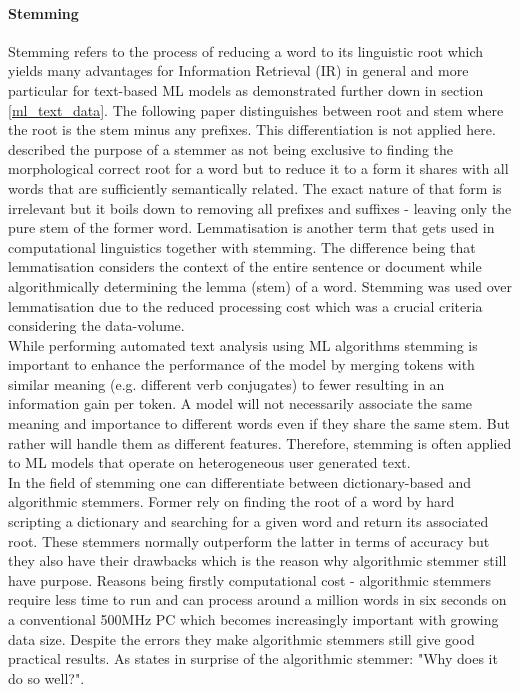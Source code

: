 \paragraph*{Stemming} \label{word_stemming}
Stemming refers to the process of reducing a word to its linguistic root which yields many advantages for Information Retrieval (IR) in general and more particular for text-based ML models as demonstrated further down in section \ref{ml_text_data}. The following paper \textcite{Lovins1968} distinguishes between root and stem where the root is the stem minus any prefixes. This differentiation is not applied here. 
\textcite{Weissweiler2018} described the purpose of a stemmer as not being exclusive to finding the morphological correct root for a word but to reduce it to a form it shares with all words that are sufficiently semantically related. The exact nature of that form is irrelevant but it boils down to removing all prefixes and suffixes - leaving only the pure stem of the former word. Lemmatisation is another term that gets used in computational linguistics together with stemming. The difference being that lemmatisation considers the context of the entire sentence or document while algorithmically determining the lemma (stem) of a word. Stemming was used over lemmatisation due to the reduced processing cost which was a crucial criteria considering the data-volume.\\
While performing automated text analysis using ML algorithms stemming is important to enhance the performance of the model by merging tokens with similar meaning (e.g. different verb conjugates) to fewer resulting in an information gain per token. A model will not necessarily associate the same meaning and importance to different words even if they share the same stem. But rather will handle them as different features. Therefore, stemming is often applied to ML models that operate on heterogeneous user generated text.\\
In the field of stemming one can differentiate between dictionary-based and algorithmic stemmers. Former rely on finding the root of a word by hard scripting a dictionary and searching for a given word and return its associated root. These stemmers normally outperform the latter in terms of accuracy but they also have their drawbacks which is the reason why algorithmic stemmer still have purpose. Reasons being firstly computational cost - algorithmic stemmers require less time to run and can process around a million words in six seconds on a conventional 500MHz PC \parencite{Porter2001} which becomes increasingly important with growing data size. Despite the errors they make algorithmic stemmers still give good practical results. As \textcite{Krovetz1995} states in surprise of the algorithmic stemmer: "Why does it do so well?".\\ 
